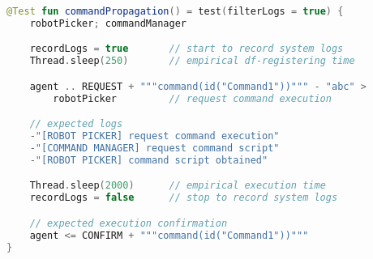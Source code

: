 \begin{lstlisting}[language=Kotlin, caption=Esempio di test `basato sul logging' permesso dall'utilizzo del framework, label=listing:logging-testing]
@Test fun commandPropagation() = test(filterLogs = true) {
    robotPicker; commandManager

    recordLogs = true       // start to record system logs
    Thread.sleep(250)       // empirical df-registering time

    agent .. REQUEST + """command(id("Command1"))""" - "abc" >
        robotPicker         // request command execution

    // expected logs
    -"[ROBOT PICKER] request command execution"
    -"[COMMAND MANAGER] request command script"
    -"[ROBOT PICKER] command script obtained"

    Thread.sleep(2000)      // empirical execution time
    recordLogs = false      // stop to record system logs

    // expected execution confirmation
    agent <= CONFIRM + """command(id("Command1"))"""
}
\end{lstlisting}

